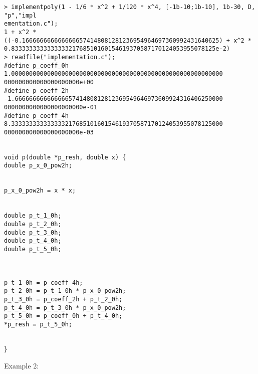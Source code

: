 \begin{center}\begin{minipage}{15cm}\begin{Verbatim}[frame=single]
> implementpoly(1 - 1/6 * x^2 + 1/120 * x^4, [-1b-10;1b-10], 1b-30, D, "p","impl
ementation.c");
1 + x^2 * ((-0.1666666666666666574148081281236954964697360992431640625) + x^2 * 
0.833333333333333321768510160154619370587170124053955078125e-2)
> readfile("implementation.c");
#define p_coeff_0h 1.00000000000000000000000000000000000000000000000000000000000
000000000000000000000e+00
#define p_coeff_2h -1.6666666666666665741480812812369549646973609924316406250000
0000000000000000000000e-01
#define p_coeff_4h 8.33333333333333321768510160154619370587170124053955078125000
000000000000000000000e-03


void p(double *p_resh, double x) {
double p_x_0_pow2h;


p_x_0_pow2h = x * x;


double p_t_1_0h;
double p_t_2_0h;
double p_t_3_0h;
double p_t_4_0h;
double p_t_5_0h;
 


p_t_1_0h = p_coeff_4h;
p_t_2_0h = p_t_1_0h * p_x_0_pow2h;
p_t_3_0h = p_coeff_2h + p_t_2_0h;
p_t_4_0h = p_t_3_0h * p_x_0_pow2h;
p_t_5_0h = p_coeff_0h + p_t_4_0h;
*p_resh = p_t_5_0h;


}

\end{Verbatim}
\end{minipage}\end{center}
\noindent Example 2: 
